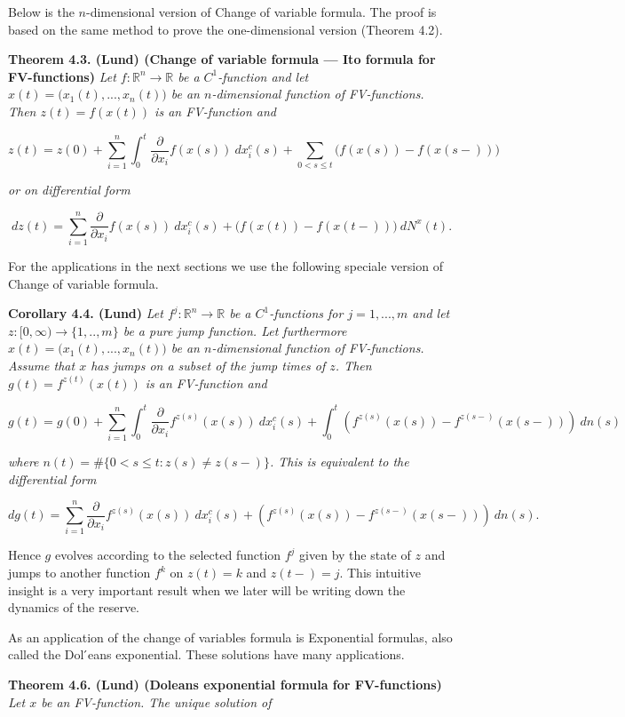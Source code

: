 \documentclass[a4paper,12pt,openany]{book}
\begin{document}
Below is the \(n\)-dimensional version of Change of variable formula. The proof is based on the same method to prove the one-dimensional version (Theorem 4.2).

\textbf{Theorem 4.3. (Lund) (Change of variable formula --- Ito formula for FV-functions)} \emph{Let \(f : \mathbb R^n\to\mathbb R\) be a \(C^1\)-function and let \(x(t)=\big(x_1(t),...,x_n(t)\big)\) be an \(n\)-dimensional function of FV-functions. Then \(z(t)=f(x(t))\) is an FV-function and}

\[
z(t)=z(0)+\sum_{i=1}^n\int_0^t\frac{\partial}{\partial x_i}f(x(s))\ dx_i^c(s)+\sum_{0<s\le t}\Big(f(x(s))-f(x(s-))\Big)
\]

\emph{or on differential form}

\[
dz(t)=\sum_{i=1}^n\frac{\partial}{\partial x_i}f(x(s))\ dx_i^c(s)+\Big(f(x(t))-f(x(t-))\Big)\ dN^x(t).
\]

For the applications in the next sections we use the following speciale version of Change of variable formula.

\textbf{Corollary 4.4. (Lund)} \emph{Let \(f^j : \mathbb R^n\to\mathbb R\) be a \(C^1\)-functions for \(j=1,...,m\) and let \(z : [0,\infty) \to \{1,..,m\}\) be a pure jump function. Let furthermore \(x(t)=\big(x_1(t),...,x_n(t)\big)\) be an \(n\)-dimensional function of FV-functions. Assume that \(x\) has jumps on a subset of the jump times of \(z\). Then \(g(t)=f^{z(t)}(x(t))\) is an FV-function and}

\[
g(t)=g(0)+\sum_{i=1}^n\int_0^t\frac{\partial}{\partial x_i}f^{z(s)}(x(s))\ dx_i^c(s)+\int_0^t\left(f^{z(s)}(x(s))-f^{z(s-)}(x(s-))\right)\ dn(s)
\]

\emph{where \(n(t)=\#\{0<s\le t: z(s)\ne z(s-)\}\). This is equivalent to the differential form}

\[
dg(t)=\sum_{i=1}^n\frac{\partial}{\partial x_i}f^{z(s)}(x(s))\ dx_i^c(s)+\left(f^{z(s)}(x(s))-f^{z(s-)}(x(s-))\right)\ dn(s).
\]

Hence \(g\) evolves according to the selected function \(f^j\) given by the state of \(z\) and jumps to another function \(f^k\) on \(z(t)=k\) and \(z(t-)=j\). This intuitive insight is a very important result when we later will be writing down the dynamics of the reserve.

As an application of the change of variables formula is Exponential formulas, also called the Dol ́eans exponential. These solutions have many applications.

\textbf{Theorem 4.6. (Lund) (Doleans exponential formula for FV-functions)} \emph{Let \(x\) be an FV-function. The unique solution of}
\end{document}
